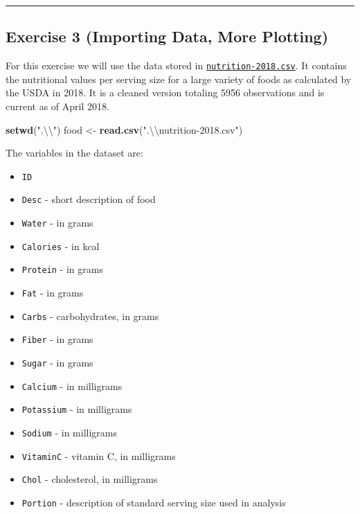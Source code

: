 \documentclass[]{article}
\newenvironment{Shaded}{\begin{snugshade}}{\end{snugshade}}
\newcommand{\KeywordTok}[1]{\textcolor[rgb]{0.13,0.29,0.53}{\textbf{#1}}}
\newcommand{\CharTok}[1]{\textcolor[rgb]{0.31,0.60,0.02}{#1}}
\newcommand{\StringTok}[1]{\textcolor[rgb]{0.31,0.60,0.02}{#1}}
\newcommand{\NormalTok}[1]{#1}
\providecommand{\tightlist}{%
  \setlength{\itemsep}{0pt}\setlength{\parskip}{0pt}}
\begin{document}
\begin{center}\rule{0.5\linewidth}{\linethickness}\end{center}

\subsection{Exercise 3 (Importing Data, More
Plotting)}\label{exercise-3-importing-data-more-plotting}

For this exercise we will use the data stored in
\href{nutrition-2018.csv}{\texttt{nutrition-2018.csv}}. It contains the
nutritional values per serving size for a large variety of foods as
calculated by the USDA in 2018. It is a cleaned version totaling 5956
observations and is current as of April 2018.

\begin{Shaded}
\begin{Highlighting}[]
\KeywordTok{setwd}\NormalTok{(}\StringTok{".}\CharTok{\textbackslash{}\textbackslash{}}\StringTok{"}\NormalTok{)}
\NormalTok{food <-}\StringTok{ }\KeywordTok{read.csv}\NormalTok{(}\StringTok{".}\CharTok{\textbackslash{}\textbackslash{}}\StringTok{nutrition-2018.csv"}\NormalTok{)}
\end{Highlighting}
\end{Shaded}

The variables in the dataset are:

\begin{itemize}
\tightlist
\item
  \texttt{ID}
\item
  \texttt{Desc} - short description of food
\item
  \texttt{Water} - in grams
\item
  \texttt{Calories} - in kcal
\item
  \texttt{Protein} - in grams
\item
  \texttt{Fat} - in grams
\item
  \texttt{Carbs} - carbohydrates, in grams
\item
  \texttt{Fiber} - in grams
\item
  \texttt{Sugar} - in grams
\item
  \texttt{Calcium} - in milligrams
\item
  \texttt{Potassium} - in milligrams
\item
  \texttt{Sodium} - in milligrams
\item
  \texttt{VitaminC} - vitamin C, in milligrams
\item
  \texttt{Chol} - cholesterol, in milligrams
\item
  \texttt{Portion} - description of standard serving size used in
  analysis
\end{itemize}
\end{document}
